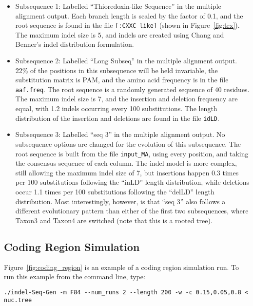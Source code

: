 \documentclass[10pt]{article}
\begin{document}
\begin{itemize}

\item[] Subsequence 1: Labelled ``Thioredoxin-like Sequence'' in the multiple alignment
output.  Each branch length is scaled by the factor of 0.1, and the root sequence is found in
the file {\tt [:CXXC\_like]} (shown in Figure~\ref{fig:trx}).  The maximum indel size is 5,
and indels are created using Chang and Benner's indel distribution formulation.

\item[] Subsequence 2: Labelled ``Long Subseq'' in the multiple alignment output.  22\% of the
positions in this subsequence will be held invariable, the substitution matrix is PAM, and the
amino acid frequency is in the file {\tt aaf.freq}.  The root sequence is a randomly generated
sequence of 40 residues.  The maximum indel size is 7, and the insertion and deletion
frequency are equal, with 1.2 indels occurring every 100 substitutions.  The length
distribution of the insertion and deletions are found in the file {\tt idLD}.

\item[] Subsequence 3: Labelled ``seq 3'' in the multiple alignment output.  No subsequence
options are changed for the evolution of this subsequence.  The root sequence is built from
the file {\tt input\_MA}, using every position, and taking the consensus sequence of each
column.  The indel model is more complex, still allowing the maximum indel size of 7, but
insertions happen 0.3 times per 100 substitutions following the ``inLD'' length distribution,
while deletions occur 1.1 times per 100 substitutions following the ``delLD'' length
distribution.  Most interestingly, however, is that ``seq 3'' also follows a different
evolutionary pattern than either of the first two subsequences, where Taxon3 and Taxon4 are
switched (note that this is a rooted tree).

\end{itemize}

\subsection{Coding Region Simulation}
\label{sec:coding_region}
Figure~\ref{fig:coding_region} is an example of a coding region simulation run. To run this
example from the command line, type:

\begin{verbatim}
./indel-Seq-Gen -m F84 --num_runs 2 --length 200 -w -c 0.15,0.05,0.8 < nuc.tree
\end{verbatim}
\end{document}
